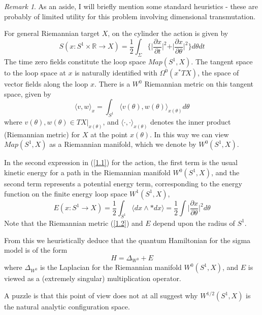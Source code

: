 \documentclass{amsart}
\theoremstyle{conjecture}
\theoremstyle{definition}
\theoremstyle{question}
\theoremstyle{questions}
\theoremstyle{remark}
\newtheorem*{remark}{Remark}
\theoremstyle{remarks}
\theoremstyle{example}
\numberwithin{equation}{section}
\begin{document}
\begin{remark}\label{remark10} As an aside, I will briefly mention some standard heuristics - these are probably of limited utility
for this problem involving dimensional transmutation.

For general Riemannian target $X$, on the cylinder the action is given by
\begin{equation}\label{1.1}S(x:S^1\times \mathbb R \to X)=\frac
12\int_{\Sigma}\{\vert\frac {\partial x}{\partial t}\vert^2+\vert\frac {
\partial x}{\partial\theta}\vert^2\}d\theta dt\end{equation}
The time zero fields constitute the loop space
$Map(S^1,X)$. The tangent
space to the loop space at $x$ is naturally identified with $\Omega^0(x^{*}
TX)$,
the space of vector fields along the loop $x$.  There is a
$W^0$ Riemannian metric on this tangent space, given by
\begin{equation}\label{1.2}\langle v,w\rangle_x=\int_{S^1}\langle v(\theta ),w(\theta )\rangle_{
x(\theta )}d\theta \end{equation}
where $v(\theta ),w(\theta )\in TX\vert_{x(\theta )}$, and $\langle
\cdot ,\cdot\rangle_{x(\theta )}$ denotes the inner
product (Riemannian metric) for $X$ at the point $x(\theta )$.  In
this way we can view $Map(S^1,X)$ as a Riemannian manifold, which we denote by $W^0(S^1,X)$.

In the second expression in (\ref{1.1}) for the action, the first term is
the usual kinetic energy for a path in the Riemannian
manifold $W^0(S^1,X)$, and the second term represents a
potential energy term, corresponding to the energy
function on the finite energy loop space $W^1(S^1,X)$,
\begin{equation}\label{1.3}E(x:S^1\to X)=\frac 12\int_{S^1}\langle dx\wedge *dx\rangle =\frac
12\int\vert\frac {\partial x}{\partial\theta}\vert^2d\theta \end{equation}
Note that the Riemannian metric (\ref{1.2}) and $E$ depend upon
the radius of $S^1$.

From this we heuristically deduce
that the quantum Hamiltonian for the sigma model is of
the form
$$H=\Delta_{W^0} +E$$
where $\Delta_{W^0}$ is the Laplacian for the Riemannian manifold
$W^0(S^1,X)$, and $E$ is viewed as a (extremely singular)
multiplication operator.

A puzzle is that this point of view does not at all suggest why $W^{1/2}(S^1,X)$
is the natural analytic configuration space.
\end{remark}
\end{document}
